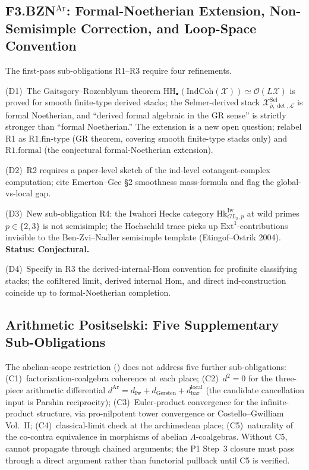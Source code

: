 \subsection{\texorpdfstring{F3.BZN\(^{\mathrm{Ar}}\)}{F3-BZN-Ar}: Formal-Noetherian Extension, Non-Semisimple Correction, and Loop-Space Convention}

The first-pass sub-obligations R1--R3 require four refinements.

(D1)~The Gaitsgory--Rozenblyum theorem
\(\mathrm{HH}_\bullet(\mathrm{IndCoh}(\mathcal{X}))\simeq\mathcal{O}(L\mathcal{X})\)
is proved for smooth finite-type derived stacks; the Selmer-derived
stack \(\mathcal{X}^{\mathrm{Sel}}_{\bar\rho,\det,\mathcal{L}}\) is
formal Noetherian, and ``derived formal algebraic in the GR sense''
is strictly stronger than ``formal Noetherian.'' The extension is a
new open question; relabel R1 as
\(\mathrm{R1.fin\text{-}type}\) (GR theorem, covering smooth
finite-type stacks only) and \(\mathrm{R1.formal}\) (the conjectural
formal-Noetherian extension).

(D2)~R2 requires a paper-level sketch of the ind-level
cotangent-complex computation; cite Emerton--Gee \S2 smoothness
mass-formula and flag the global-vs-local gap.

(D3)~New sub-obligation R4: the Iwahori Hecke category
\(\mathrm{Hk}^{\mathrm{Iw}}_{GL_{2},p}\) at wild primes
\(p\in\{2,3\}\) is not semisimple; the Hochschild trace picks up
\(\mathrm{Ext}^{1}\)-contributions invisible to the Ben-Zvi--Nadler
semisimple template (Etingof--Ostrik 2004).
\textbf{Status: Conjectural.}

(D4)~Specify in R3 the derived-internal-Hom convention for profinite
classifying stacks; the cofiltered limit, derived internal Hom, and
direct ind-construction coincide up to formal-Noetherian completion.

\subsection{Arithmetic Positselski: Five Supplementary Sub-Obligations}

The abelian-scope restriction ()
does not address five further sub-obligations:
(C1)~factorization-coalgebra coherence at each place;
(C2)~\(d^{2}=0\) for the three-piece arithmetic differential
\(d^{\mathrm{Ar}}=d_{\mathrm{Iw}}+d_{\mathrm{Gersten}}+d_{\mathrm{bar}}^{\mathrm{local}}\)
(the candidate cancellation input is Parshin reciprocity);
(C3)~Euler-product convergence for the infinite-product structure,
via pro-nilpotent tower convergence or Costello--Gwilliam Vol.~II;
(C4)~classical-limit check at the archimedean place;
(C5)~naturality of the co-contra equivalence in morphisms of
abelian \(\Lambda\)-coalgebras.
Without C5,  cannot
propagate through chained arguments; the P1 Step~3 closure must
pass through a direct argument rather than functorial pullback
until C5 is verified.

